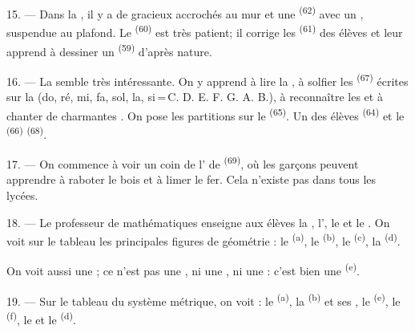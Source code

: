 \VUsaut{4.6mm}
\VUsaut{3.4mm}

15. --- Dans la , il y a de gracieux 
accrochés au mur et une  \textsuperscript{(62)} avec un
, suspendue au plafond. Le 
\textsuperscript{(60)} est très patient; il corrige les 
\textsuperscript{(61)} des élèves et leur apprend à dessiner un 
\textsuperscript{(59)} d'après nature.

16. --- La  semble très intéressante. On y apprend à
lire la , à solfier les 
\textsuperscript{(67)} écrites sur la  (do, ré, mi, fa, sol, la,
si\,=\,C. D. E. F. G. A. B.), à reconnaître les  et à chanter de
charmantes . On pose les partitions sur le 
\textsuperscript{(65)}. Un des élèves 
\textsuperscript{(64)} et le 
\textsuperscript{(66)}  \textsuperscript{(68)}.

17. --- On commence à voir un coin de l' de  \textsuperscript{(69)}, où les garçons peuvent apprendre à raboter le
bois et à limer le fer. Cela n'existe pas dans tous les lycées.

\VUsaut{5.0mm}
\VUsaut{3.6mm}

18. --- Le professeur de mathématiques enseigne aux élèves la
, l', le  et le
. On voit sur le tableau les principales figures de
géométrie : le  \textsuperscript{(a)}, le 
\textsuperscript{(b)}, le  \textsuperscript{(c)}, la
 \textsuperscript{(d)}.

On voit aussi une ; ce n'est pas une , ni
une , ni une  : c'est bien une
 \textsuperscript{(e)}.

19. --- Sur le tableau du système métrique, on voit : le 
\textsuperscript{(a)}, la  \textsuperscript{(b)} et ses
, le  \textsuperscript{(e)}, le
 \textsuperscript{(f)}, le  et le
 \textsuperscript{(d)}.

